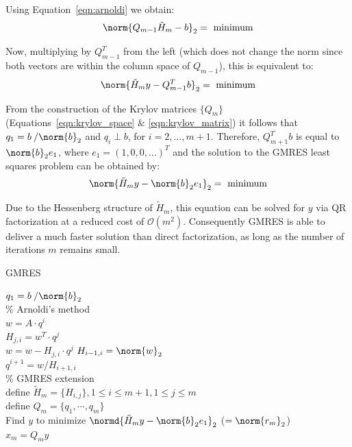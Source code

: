 \noindent Using Equation~\hyperref[eqn:arnoldi]{\ref{eqn:arnoldi}} we obtain:
\begin{equation}
    \norm{Q_{m-1}\tilde{H}_m-b}_2=\text{ minimum}
\end{equation}

\noindent Now, multiplying by $Q^T_{m-1}$ from the left (which does not change the norm since both vectors are within the column space of $Q_{m-1}$), this is equivalent to:
\begin{equation}
    \norm{\tilde{H}_my-Q^T_{m-1}b}_2 = \text{ minimum}
\end{equation}

\noindent From the construction of the Krylov matrices $\{Q_m\}$ (Equations~\hyperref[eqn:krylov_space]{\ref{eqn:krylov_space}} \& \hyperref[eqn:krylov_matrix]{\ref{eqn:krylov_matrix}}) it follows that $q_1=b\:/\norm{b}_2$ and $q_i \perp b$, for $i = 2, \dots, m+1$. Therefore, $Q^T_{m+1}b$ is equal to $\norm{b}_2e_1$, where $e_1=(1,0,0,\dots)^T$ and the solution to the GMRES least squares problem can be obtained by:
\begin{equation}
    \norm{\tilde{H}_my-\norm{b}_2e_1}_2 = \text{ minimum}
\end{equation}

\noindent Due to the Hessenberg structure of $\tilde{H}_m$, this equation can be solved for $y$ via QR factorization at a reduced cost of $\mathcal{O}(m^2)$. Consequently GMRES is able to deliver a much faster solution than direct factorization, as long as the number of iterations $m$ remains small.

\begin{algorithm}[h]
  \caption{GMRES}
  \label{alg:gmres}
  \SetAlgoLined
  \DontPrintSemicolon
  $q_1= b\:/\norm{b}_2$ \\
  \% Arnoldi's method \\
   {
    $w =A\cdot q^i$ \\
     {
      $H_{j,i} = w^T\cdot q^j$ \\
      $ w = w - H_{j,i}\cdot q^j$}
    $H_{i-1,i} = \norm{w}_2$ \\
    $q^{i+1} = w/H_{i+1,i}$ \\
  }
  \;
  \% GMRES extension \\
  define $\tilde{H}_m = \{H_{i,j}\}, 1 \leq i \leq m+1, 1 \leq j \leq m$ \\
  define $Q_m = \{q_1, \cdots, q_m\}$ \\
  Find $y$ to minimize $\normd{\tilde{H}_my-\norm{b}_2e_1}_2$ ($=\norm{r_m}_2$) \\
  $x_m = Q_my$
\end{algorithm}

